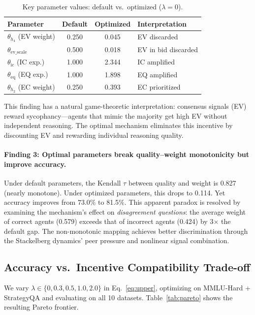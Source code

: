 \documentclass[runningheads]{llncs}
\begin{document}
\begin{table}[t]
\caption{Key parameter values: default vs.\ optimized ($\lambda=0$).}\label{tab:params}
\centering
\begin{tabular}{@{}lccl@{}}
\toprule
Parameter & Default & Optimized & Interpretation \\
\midrule
$\theta_{h_4}$ (EV weight) & 0.250 & 0.045 & EV discarded \\
$\theta_{\text{ev\_scale}}$ & 0.500 & 0.018 & EV in bid discarded \\
$\theta_{\text{ic}}$ (IC exp.) & 1.000 & 2.344 & IC amplified \\
$\theta_{\text{eq}}$ (EQ exp.) & 1.000 & 1.898 & EQ amplified \\
$\theta_{h_2}$ (EC weight) & 0.250 & 0.393 & EC prioritized \\
\bottomrule
\end{tabular}
\end{table}

This finding has a natural game-theoretic interpretation: consensus signals (EV) reward sycophancy---agents that mimic the majority get high EV without independent reasoning. The optimal mechanism eliminates this incentive by discounting EV and rewarding individual reasoning quality.

\paragraph{Finding 3: Optimal parameters break quality--weight monotonicity but improve accuracy.}
Under default parameters, the Kendall $\tau$ between quality and weight is 0.827 (nearly monotone). Under optimized parameters, this drops to 0.114. Yet accuracy improves from 73.0\% to 81.5\%. This apparent paradox is resolved by examining the mechanism's effect on \emph{disagreement questions}: the average weight of correct agents (0.579) exceeds that of incorrect agents (0.424) by 3$\times$ the default gap. The non-monotonic mapping achieves better discrimination through the Stackelberg dynamics' peer pressure and nonlinear signal combination.

\subsection{Accuracy vs.\ Incentive Compatibility Trade-off}

We vary $\lambda \in \{0, 0.3, 0.5, 1.0, 2.0\}$ in Eq.~\eqref{eq:upper}, optimizing on MMLU-Hard + StrategyQA and evaluating on all 10 datasets. Table~\ref{tab:pareto} shows the resulting Pareto frontier.
\end{document}
